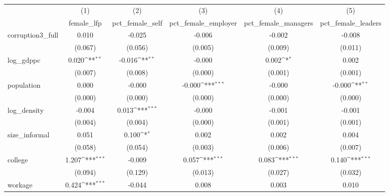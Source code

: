 {
\def\sym#1{\ifmmode^{#1}\else\(^{#1}\)\fi}
\begin{tabular}{l*{5}{c}}
\hline\hline
            &\multicolumn{1}{c}{(1)}&\multicolumn{1}{c}{(2)}&\multicolumn{1}{c}{(3)}&\multicolumn{1}{c}{(4)}&\multicolumn{1}{c}{(5)}\\
            &\multicolumn{1}{c}{female\_lfp}&\multicolumn{1}{c}{pct\_female\_self}&\multicolumn{1}{c}{pct\_female\_employer}&\multicolumn{1}{c}{pct\_female\_managers}&\multicolumn{1}{c}{pct\_female\_leaders}\\
\hline
corruption3\_full&       0.010         &      -0.025         &      -0.006         &      -0.002         &      -0.008         \\
            &     (0.067)         &     (0.056)         &     (0.005)         &     (0.009)         &     (0.011)         \\
[1em]
log\_gdppc   &       0.020\sym{**} &      -0.016\sym{**} &      -0.000         &       0.002\sym{*}  &       0.002         \\
            &     (0.007)         &     (0.008)         &     (0.000)         &     (0.001)         &     (0.001)         \\
[1em]
population  &       0.000         &      -0.000         &      -0.000\sym{***}&      -0.000         &      -0.000\sym{**} \\
            &     (0.000)         &     (0.000)         &     (0.000)         &     (0.000)         &     (0.000)         \\
[1em]
log\_density &      -0.004         &       0.013\sym{***}&      -0.000         &      -0.001         &      -0.001         \\
            &     (0.004)         &     (0.004)         &     (0.000)         &     (0.001)         &     (0.001)         \\
[1em]
size\_informal&       0.051         &       0.100\sym{*}  &       0.002         &       0.002         &       0.004         \\
            &     (0.058)         &     (0.054)         &     (0.003)         &     (0.006)         &     (0.007)         \\
[1em]
college     &       1.207\sym{***}&      -0.009         &       0.057\sym{***}&       0.083\sym{***}&       0.140\sym{***}\\
            &     (0.094)         &     (0.129)         &     (0.013)         &     (0.027)         &     (0.032)         \\
[1em]
workage     &       0.424\sym{***}&      -0.044         &       0.008         &       0.003         &       0.010         \\

\end{tabular}}
